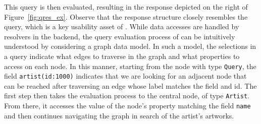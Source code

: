 This query is then evaluated, resulting in the response
depicted on the right of Figure~\ref{fig:qres_ex}. Observe that the
response structure closely
resembles the query, which is a key usability asset of \gql.
While data accesses are handled by resolvers in the backend, the query evaluation process of \gql can be intuitively understood by considering a graph data model. In such a model, the selections in a query indicate what edges to traverse in the graph and what properties to access on each node. In this manner, starting from the node with type \texttt{Query}, the field \texttt{artist(id:1000)} indicates that 
we are looking for an adjacent node that can be reached after traversing an edge whose label matches the
field and id. The first step then takes the evaluation process to the central
node, of type \texttt{Artist}. From there, it accesses the value
of the node's property matching the field \texttt{name} and then
continues navigating the graph in search of the artist's artworks.

